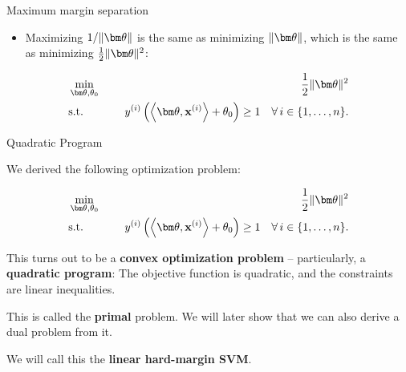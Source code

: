 \documentclass[11pt,compress,t,notes=noshow, xcolor=table]{beamer}
\begin{document}
\begin{vbframe}{Maximum margin separation}
 \begin{itemize}
  \item Maximizing $1 / \|\thetav\|$ is the same as minimizing $\|\thetav\|$, which is the same as minimizing $\frac{1}{2}\|\thetav\|^2$:
  \end{itemize}

\begin{eqnarray*}
  & \min\limits_{\thetav, \theta_0} \quad & \frac{1}{2} \|\thetav\|^2 \\
   & \text{s.t.} & \,\,\yi  \left( \scp{\thetav}{\xi} + \theta_0 \right) \geq 1 \quad \forall\, i \in \nset.
\end{eqnarray*}

\end{vbframe}

\begin{vbframe}{Quadratic Program}

We derived the following optimization problem:

  \begin{eqnarray*}
  & \min\limits_{\thetav, \theta_0} \quad & \frac{1}{2} \|\thetav\|^2 \\
  & \text{s.t.} & \,\,\yi  \left( \scp{\thetav}{\xi} + \theta_0 \right) \geq 1 \quad \forall\, i \in \nset.
\end{eqnarray*}

This turns out to be a \textbf{convex optimization problem} -- particularly, a \textbf{quadratic program}: The objective function is quadratic, and the constraints are linear inequalities.

\lz

This is called the \textbf{primal} problem. We will later show that we can also derive a dual problem from it.

\lz

We will call this the \textbf{linear hard-margin SVM}.
\end{vbframe}
\end{document}
